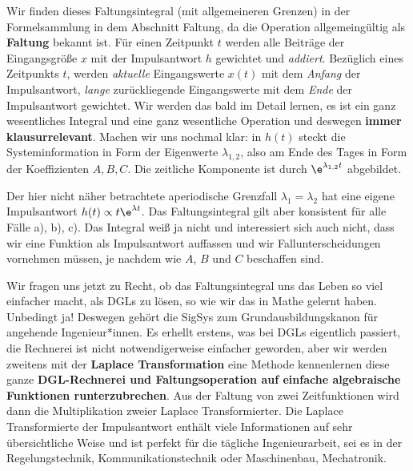 Wir finden dieses Faltungsintegral (mit allgemeineren Grenzen) in der
Formelsammlung in dem Abschnitt Faltung, da die Operation allgemeingültig als
\textbf{Faltung} bekannt ist.
%
Für einen Zeitpunkt $t$ werden alle Beiträge der Eingangsgröße $x$ mit der Impulsantwort $h$
gewichtet und \textit{addiert}. Bezüglich eines Zeitpunkts $t$, werden \textit{aktuelle}
Eingangswerte $x(t)$ mit dem \textit{Anfang} der Impulsantwort, \textit{lange}
zurückliegende Eingangswerte mit dem \textit{Ende} der Impulsantwort gewichtet.
%
Wir werden das bald im Detail lernen, es ist ein ganz wesentliches Integral und
eine ganz wesentliche Operation und deswegen \textbf{immer klausurrelevant}.
%
Machen wir uns nochmal klar: in $h(t)$ steckt die Systeminformation in Form
der Eigenwerte $\lambda_{1,2}$, also am Ende des Tages in Form der Koeffizienten $A,B,C$.
Die zeitliche Komponente ist durch $\e^{\lambda_{1,2} t}$ abgebildet.

Der hier nicht näher betrachtete aperiodische Grenzfall $\lambda_1 = \lambda_2$
hat eine eigene Impulsantwort $h(t) \propto t \e^{\lambda t}$.
%
Das Faltungsintegral gilt aber konsistent
für alle Fälle a), b), c). Das Integral weiß ja nicht und interessiert sich auch nicht,
dass wir eine Funktion als Impulsantwort auffassen und wir Fallunterscheidungen
vornehmen müssen, je nachdem wie $A$, $B$ und $C$ beschaffen sind.

Wir fragen uns jetzt zu Recht, ob das Faltungsintegral
uns das Leben so viel einfacher macht, als DGLs zu lösen, so wie wir das in Mathe
gelernt haben.
%
Unbedingt ja! Deswegen gehört die SigSys zum Grundausbildungskanon für angehende
Ingenieur*innen.
Es erhellt erstens, was bei DGLs eigentlich passiert, die Rechnerei
ist nicht notwendigerweise einfacher geworden, aber wir werden zweitens mit der
\textbf{Laplace Transformation} eine
Methode kennenlernen diese ganze \textbf{DGL-Rechnerei und Faltungsoperation auf
einfache algebraische Funktionen runterzubrechen}. Aus der Faltung von zwei
Zeitfunktionen wird dann die Multiplikation zweier Laplace Transformierter.
%
Die Laplace Transformierte der Impulsantwort enthält viele Informationen auf
sehr übersichtliche Weise und ist perfekt für die tägliche Ingenieurarbeit, sei
es in der Regelungstechnik, Kommunikationstechnik oder Maschinenbau, Mechatronik.

\newpage
